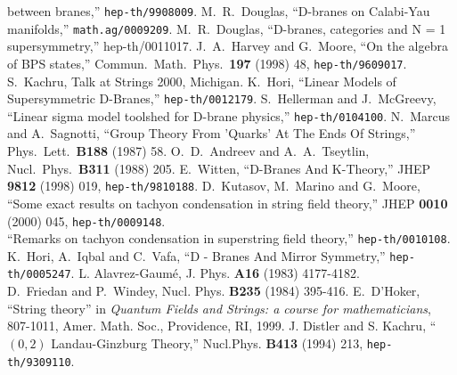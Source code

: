 \documentclass[a4paper,12pt]{article}
\begin{document}
\begin{thebibliography}{99}
between branes,'' 
{\tt hep-th/9908009}. 
M.~R.~Douglas, ``D-branes on Calabi-Yau manifolds,''
{\tt math.ag/0009209}.
M.~R.~Douglas,
``D-branes, categories and N = 1 supersymmetry,''
hep-th/0011017.
 J.~A.~Harvey and G.~Moore, ``On the algebra of BPS
states,'' Commun.\ Math.\ Phys.\ {\bf 197} (1998) 48,
{\tt hep-th/9609017}.
 S.~Kachru, Talk at Strings 2000, Michigan.  
K.~Hori, ``Linear Models of Supersymmetric D-Branes,''
{\tt hep-th/0012179}.
S.~Hellerman and J.~McGreevy,
``Linear sigma model toolshed for D-brane physics,''
{\tt hep-th/0104100}.
N.~Marcus and A.~Sagnotti,
``Group Theory From 'Quarks' At The Ends Of Strings,''
Phys.\ Lett.\  {\bf B188} (1987) 58.
O.~D.~Andreev and A.~A.~Tseytlin,
Nucl.\ Phys.\  {\bf B311} (1988) 205.
 E.~Witten, ``D-Branes And K-Theory,'' JHEP
{\bf 9812} (1998) 019, {\tt hep-th/9810188}.
D.~Kutasov, M.~Marino and G.~Moore,
``Some exact results on tachyon condensation in string field theory,''
JHEP {\bf 0010} (2000) 045, 
{\tt hep-th/0009148}.  \\
``Remarks on tachyon condensation in superstring field theory,''
{\tt hep-th/0010108}. 
 K.~Hori, A.~Iqbal and C.~Vafa, ``D - Branes And Mirror
Symmetry,'' {\tt hep-th/0005247}.
 L. Alavrez-Gaum\'e, J. Phys. {\bf A16}
(1983) 4177-4182. \\
D.~Friedan and P.~Windey, Nucl. Phys. {\bf B235} (1984) 395-416.
 E.~D'Hoker, ``String theory'' in {\em Quantum Fields
and Strings: a course for mathematicians}, 807-1011, Amer. Math. Soc.,
Providence, RI, 1999.
 J. Distler and S. Kachru,  ``$(0,2)$ Landau-Ginzburg
Theory,'' Nucl.Phys. {\bf B413} (1994) 213, {\tt hep-th/9309110}.\\

\end{thebibliography}
\end{document}
